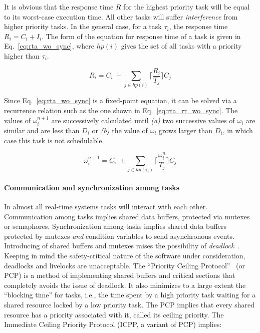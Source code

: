 It is obvious that the response time $R$ for the highest priority task
will be equal to its worst-case execution time. All other tasks will
suffer \emph{interference} from higher priority tasks. In the general
case, for a task $\tau_i$, the response time $R_i = C_i + I_i$. The
form of the equation for response time of a task is given in
Eq.~\ref{eq:rta_wo_sync}, where $hp(i)$ gives the set of all tasks
with a priority higher than $\tau_i$.

\begin{equation}
\label{eq:rta_wo_sync}
R_i = C_i \ + \sum_{j\in hp(i)} \bigg\lceil\frac{R_i}{T_j}\bigg\rceil C_j
\end{equation}

Since Eq.~\ref{eq:rta_wo_sync} is a fixed-point equation, it can be
solved via a recurrence relation such as the one shown in
Eq.~\ref{eq:rta_rr_wo_sync}. The values of $\omega_i^{n+1}$ are
successively calculated until \emph{(a)} two successive values of
$\omega_i$ are similar and are less than $D_i$ or \emph{(b)} the value
of $\omega_i$ grows larger than $D_i$, in which case this task is not
schedulable.

\begin{equation}
\label{eq:rta_rr_wo_sync}
\omega_i^{n+1}=C_i \ + \sum_{j \in hp(\tau_i)}
\bigg\lceil\frac{\omega_i^n}{T_j}\bigg\rceil C_j
\end{equation}

\paragraph{Communication and synchronization among tasks}
In almost all real-time systems tasks will interact with each
other. Communication among tasks implies shared data buffers,
protected via mutexes or semaphores. Synchronization among tasks
implies shared data buffers protected by mutexes \emph{and} condition
variables to send asynchronous events. Introducing of shared buffers
and mutexes raises the possibility of
\emph{deadlock}~\cite{levine@sigops03}. Keeping in mind the
safety-critical nature of the software under consideration, deadlocks
and livelocks are unacceptable. The ``Priority Ceiling
Protocol''~\cite{sha@toc90} (or PCP) is a method of implementing
shared buffers and critical sections that completely avoids the issue
of deadlock. It also minimizes to a large extent the ``blocking time''
for tasks, i.e., the time spent by a high priority task waiting for a
shared resource locked by a low priority task. The PCP implies that
every shared resource has a priority associated with it, called its
ceiling priority. The Immediate Ceiling Priority Protocol (ICPP, a
variant of PCP) implies:

